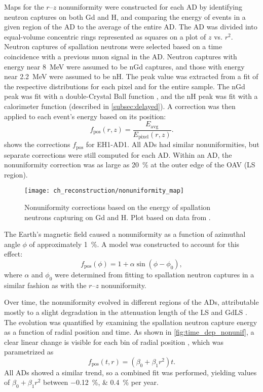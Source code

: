 Maps for the $r$--$z$ nonuniformity were constructed for each AD
by identifying neutron captures on both Gd and H,
and comparing the energy of events in a given region of the AD
to the average of the entire AD.
The AD was divided into equal-volume concentric rings
represented as squares on a plot of $z$ vs. $r^2$.
Neutron captures of spallation neutrons were selected
based on a time coincidence with a previous muon signal in the AD.
Neutron captures with energy near \SI{8}{\MeV} were assumed to be nGd captures,
and those with energy near \SI{2.2}{\MeV} were assumed to be nH.
The peak value was extracted from a fit of the respective distributions
for each pixel and for the entire sample.
The nGd peak was fit with a double-Crystal Ball function \cite{cbfunction},
and the nH peak was fit with a calorimeter function \cite{calorimeter2016}
(described in \cref{subsec:delayed}).
A correction was then applied to each event's energy based on its position:
\begin{equation}
    f_{\text{pos}}(r, z) = \frac{E_{\text{avg}}}{E_{\text{pixel}}(r,z)}.
\end{equation}
 shows the corrections $f_{\text{pos}}$ for EH1-AD1.
All ADs had similar nonuniformities, but separate corrections were still computed
for each AD.
Within an AD, the nonuniformity correction was as large as \SI{20}{\percent}
at the outer edge of the OAV (LS region).

\begin{figure}
    \centering
    \texttt{[image: ch\_reconstruction/nonuniformity\_map]}
    \caption{
        Nonuniformity corrections based on the energy of spallation neutrons
        capturing on Gd and H.
        Plot based on data from \cite{nonuniformity2}.
    }
    \label{fig:nonuniformity_map}
\end{figure}

The Earth's magnetic field caused a nonuniformity
as a function of azimuthal angle $\phi$ of approximately \SI{1}{\percent}.
A model was constructed to account for this effect:
\begin{equation}
    f_{\text{pos}}(\phi) = 1 + \alpha\sin(\phi-\phi_0),
\end{equation}
where $\alpha$ and $\phi_0$ were determined from fitting to spallation neutron captures
in a similar fashion as with the $r$--$z$ nonuniformity.

Over time, the nonuniformity evolved in different regions of the ADs,
attributable mostly to a slight degradation in the attenuation length of the LS
and GdLS \cite{nonuniformity3}.
The evolution was quantified by examining the spallation neutron capture energy
as a function of radial position and time.
As shown in \cref{fig:time_dep_nonunif}, a clear linear change is visible
for each bin of radial position \cite{nonuniformity1}, which was parametrized as
\begin{equation}
    f_{\text{pos}}(t, r) = (\beta_0 + \beta_1r^2)t.
\end{equation}
All ADs showed a similar trend, so a combined fit was performed,
yielding values of $\beta_0 + \beta_1r^2$ between
\SIlist[retain-explicit-plus]{-0.12;+0.4}{\percent} per year.

